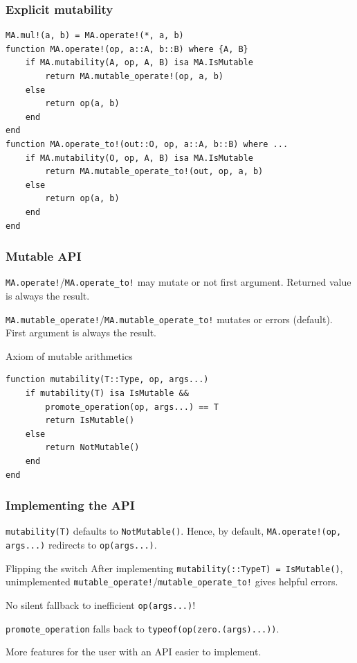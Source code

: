 \documentclass{beamer}
\begin{document}
\begin{frame}[fragile]
  \frametitle{Explicit mutability}
\begin{verbatim}
MA.mul!(a, b) = MA.operate!(*, a, b)
function MA.operate!(op, a::A, b::B) where {A, B}
    if MA.mutability(A, op, A, B) isa MA.IsMutable
        return MA.mutable_operate!(op, a, b)
    else
        return op(a, b)
    end
end
function MA.operate_to!(out::O, op, a::A, b::B) where ...
    if MA.mutability(O, op, A, B) isa MA.IsMutable
        return MA.mutable_operate_to!(out, op, a, b)
    else
        return op(a, b)
    end
end
\end{verbatim}
\end{frame}

\begin{frame}[fragile]
  \frametitle{Mutable API}
\texttt{MA.operate!}/\texttt{MA.operate\_to!} \alert{may} mutate or not first argument.
Returned value is \alert{always} the result.

\texttt{MA.mutable\_operate!}/\texttt{MA.mutable\_operate\_to!} mutates or \alert{errors} (default).
First argument is \alert{always} the result.

  \begin{block}{Axiom of mutable arithmetics}
\begin{verbatim}
function mutability(T::Type, op, args...)
    if mutability(T) isa IsMutable &&
        promote_operation(op, args...) == T
        return IsMutable()
    else
        return NotMutable()
    end
end
\end{verbatim}
  \end{block}
\end{frame}

\begin{frame}[fragile]
  \frametitle{Implementing the API}
  \texttt{mutability(T)} defaults to \texttt{NotMutable()}.
  Hence, by default,
  \texttt{MA.operate!(op, args...)} redirects to \texttt{op(args...)}.

  \begin{block}{Flipping the switch}
  After implementing \texttt{mutability(::Type{T}) = IsMutable()},
  unimplemented \texttt{mutable\_operate!}/\texttt{mutable\_operate\_to!}
  gives helpful errors.

  \alert{No silent} fallback to inefficient \texttt{op(args...)}!

  \texttt{promote\_operation} falls back to \texttt{typeof(op(zero.(args)...))}.

  \end{block}
  More \alert{features} for the user with an API \alert{easier} to implement.
\end{frame}
\end{document}
